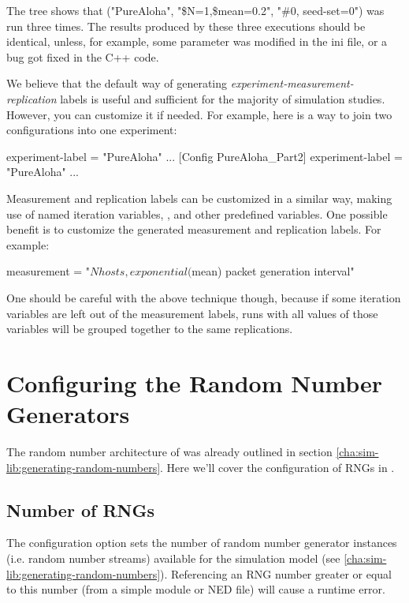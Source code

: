 The tree shows that ("PureAloha", "\$N=1,\$mean=0.2", "\#0, seed-set=0")
was run three times. The results produced
by these three executions should be identical, unless, for example,
some parameter was modified in the ini file, or a bug got fixed in the
C++ code.

We believe that the default way of generating
\textit{experiment-measurement-replication} labels is useful and
sufficient for the majority of simulation studies. However, you can
customize it if needed. For example, here is a way to join two
configurations into one experiment:

\begin{inifile}
experiment-label = "PureAloha"
...
[Config PureAloha_Part2]
experiment-label = "PureAloha"
...
\end{inifile}

Measurement and replication labels can be customized in a similar way,
making use of named iteration variables, ,
 and other predefined variables. One possible benefit is
to customize the generated measurement and replication labels. For
example:

\begin{inifile}
measurement = "${N} hosts, exponential(${mean}) packet generation interval"
\end{inifile}

One should be careful with the above technique though, because if some
iteration variables are left out of the measurement labels, runs with
all values of those variables will be grouped together to the same
replications.


\section{Configuring the Random Number Generators}
\label{sec:ch-config-sim:rng-config}

The random number architecture of {\opp} was already outlined
in section \ref{cha:sim-lib:generating-random-numbers}. Here
we'll cover the configuration of RNGs in .

\subsection{Number of RNGs}

The  configuration option sets the number of
random number generator instances (i.e. random number streams)
available for the simulation model (see \ref{cha:sim-lib:generating-random-numbers}).
Referencing an RNG number greater or equal to this number
(from a simple module or NED file) will cause a runtime error.


